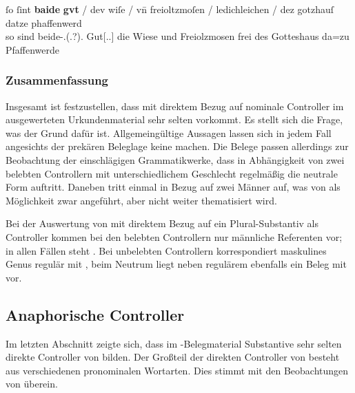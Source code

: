 \begin{exe}
\ex\label{ex:1584_gut}
	\gll ſo ſint \textbf{baide} \textbf{gvt} / dev wiſe / vn̄ freioltzmoſen /
			ledichleichen / dez gotzhauſ datze phaffenwerd \\
		so sind beide-\Nom.\Pl(.\N\subI?).\St{} Gut[\Nom.\Pl.\NeutI] {} die
			Wiese {} und Freiolzmosen {} frei {} des Gotteshaus da=zu
			Pfaffenwerde \\
	\begin{taggedline}{\parencites(Kl.~Herrenchiemsee, Kr.~Rosenheim, 1292)[\pno~1584, 727.26--27]{cao2}}
		\trans {}
	\end{taggedline}
\end{exe}

\subsubsection{Zusammenfassung}

Insgesamt ist festzustellen, dass  mit direktem Bezug auf
nominale Controller im ausgewerteten Urkundenmaterial sehr selten vorkommt. Es
stellt sich die Frage, was der Grund dafür ist. Allgemeingültige Aussagen
lassen sich in jedem Fall angesichts der prekären Beleglage keine machen. Die
Belege passen allerdings zur Beobachtung der einschlägigen Grammatikwerke, dass
in Abhängigkeit von zwei belebten Controllern mit unterschiedlichem Geschlecht
regelmäßig die neutrale Form  auftritt. Daneben tritt
 einmal in Bezug auf zwei Männer auf, was von
\textcite[384]{paul2007} als Möglichkeit zwar angeführt, aber nicht weiter
thematisiert wird.

Bei der Auswertung von  mit direktem Bezug auf ein
Plural-Substantiv als Controller kommen bei den belebten Controllern nur
männliche Referenten vor; in allen Fällen steht . Bei unbelebten
Controllern korrespondiert maskulines Genus regulär mit , beim
Neutrum liegt neben regulärem  ebenfalls ein Beleg mit
 vor.

\subsection{Anaphorische Controller}
\label{subsec:refctrl}

Im letzten Abschnitt zeigte sich, dass im \CAO{}-Belegmaterial
Substantive sehr selten direkte Controller von  bilden. Der
Großteil der direkten Controller von  besteht aus verschiedenen
pronominalen Wortarten.
Dies stimmt mit den Beobachtungen von \citet[624--625]{ksw2} überein.

